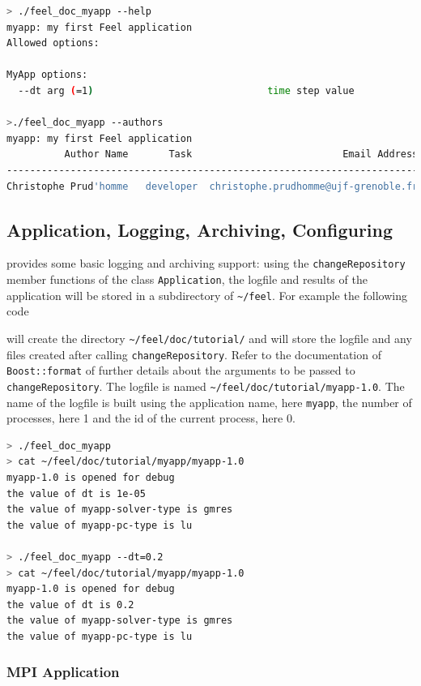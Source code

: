 \begin{lstlisting}[language=sh]
> ./feel_doc_myapp --help
myapp: my first Feel application
Allowed options:

MyApp options:
  --dt arg (=1)                              time step value

>./feel_doc_myapp --authors
myapp: my first Feel application
          Author Name       Task                          Email Address
-----------------------------------------------------------------------
Christophe Prud'homme   developer  christophe.prudhomme@ujf-grenoble.fr
\end{lstlisting}

\subsection{Application, Logging, Archiving, Configuring}
\label{sec:appl-logg-arch}

\feel provides some basic logging and archiving support: using the
\lstinline!changeRepository! member functions of the class
\lstinline!Application!, the logfile and results of the application
will be stored in a subdirectory of \lstinline!~/feel!. For
example the following code



will create the directory \lstinline!~/feel/doc/tutorial/! and will store the
logfile and any files created after calling
\lstinline!changeRepository!. Refer to the documentation of
\lstinline!Boost::format! of further details about the arguments to be
passed to \lstinline!changeRepository!. The logfile is named
\lstinline!~/feel/doc/tutorial/myapp-1.0!. The name of the logfile is built
using the application name, here \lstinline!myapp!, the number of
processes, here 1 and the id of the current process, here 0.

\begin{lstlisting}[language=sh]
> ./feel_doc_myapp
> cat ~/feel/doc/tutorial/myapp/myapp-1.0 
myapp-1.0 is opened for debug
the value of dt is 1e-05
the value of myapp-solver-type is gmres
the value of myapp-pc-type is lu 

> ./feel_doc_myapp --dt=0.2
> cat ~/feel/doc/tutorial/myapp/myapp-1.0
myapp-1.0 is opened for debug
the value of dt is 0.2
the value of myapp-solver-type is gmres
the value of myapp-pc-type is lu
\end{lstlisting}

\subsubsection{MPI Application}

